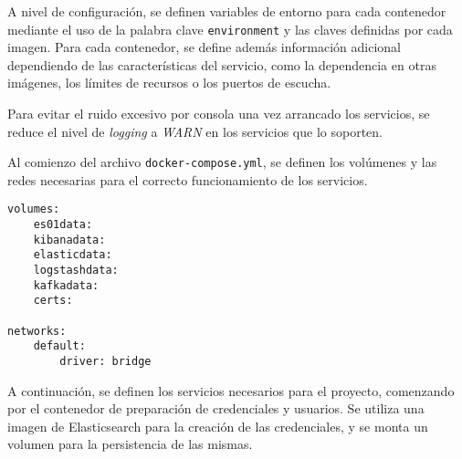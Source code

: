 A nivel de configuración, se definen variables de entorno para cada contenedor
mediante el uso de la palabra clave \texttt{environment} y las claves definidas
por cada imagen. Para cada contenedor, se define además información adicional
dependiendo de las características del servicio, como la dependencia en otras
imágenes, los límites de recursos o los puertos de escucha.

Para evitar el ruido excesivo por consola una vez arrancado los servicios, se
reduce el nivel de \textit{logging} a \textit{WARN} en los servicios que lo
soporten.

Al comienzo del archivo \texttt{docker-compose.yml}, se definen los volúmenes y
las redes necesarias para el correcto funcionamiento de los servicios.

\begin{lstlisting}[style=yaml, caption={Definición de volúmenes y redes en Docker Compose}]
volumes:
	es01data:
	kibanadata:
	elasticdata:
	logstashdata:
	kafkadata:
	certs:

networks:
	default:
		driver: bridge
\end{lstlisting}

A continuación, se definen los servicios necesarios para el proyecto, comenzando
por el contenedor de preparación de credenciales y usuarios. Se utiliza una
imagen de Elasticsearch para la creación de las credenciales, y se monta un
volumen para la persistencia de las mismas.

